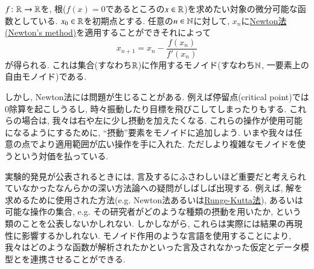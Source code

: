 \begin{application}


$f\colon{\mathbb R}\rightarrow{\mathbb R}$を, 根($f(x)=0$であるところの$x\in{\mathbb R}$)を求めたい対象の微分可能な函数としている. $x_0\in{\mathbb R}$を初期点とする. 任意の$n\in{\mathbb N}$に対して, $x_n$に\href{http://en.wikipedia.org/wiki/Newton's_method}{Newton法(\text Newton's method)}を適用することができそれによって$$x_{n+1}=x_n-\frac{f(x_n)}{f'(x_n)}$$が得られる.
これは集合(すなわち${\mathbb R}$)に作用するモノイド(すなわち${\mathbb N}$, 一要素上の自由モノイド)である.


しかし, Newton法には問題が生じることがある. 例えば停留点(critical point)では0除算を起こしうるし, 時々振動したり目標を飛びこしてしまったりもする. これらの場合は, 我々は右や左に少し摂動を加えたくなる. これらの操作が使用可能になるようにするために, ``摂動''要素をモノイドに追加しよう. いまや我々は任意の点でより適用範囲が広い操作を手に入れた. ただしより複雑なモノイドを使うという対価を払っている. 


実験的発見が公表されるときには, 言及するにふさわしいほど重要だと考えられていなかったなんらかの深い方法論への疑問がしばしば出現する. 例えば, 解を求めるために使用された方法(e.g. Newton法あるいは\href{https://en.wikipedia.org/wiki/Runge\%E2\%80\%93Kutta_methods}{Runge-Kutta法}), あるいは可能な操作の集合, e.g. その研究者がどのような種類の摂動を用いたか, という類のことを公表しないかしれない. しかしながら, これらは実際には結果の再現性に影響するかしれない. モノイド作用のような言語を使用することにより, 我々はどのような函数が解析されたかといった言及されなかった仮定とデータ模型とを連携させることができる.

\end{application}

